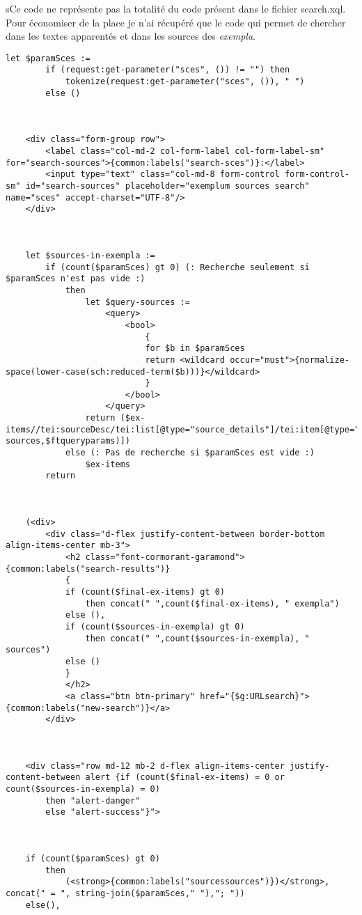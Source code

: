 sCe code ne représente pas la totalité du code présent dans le fichier search.xql. Pour économiser de la place je n'ai récupéré que le code qui permet de chercher dans les textes apparentés et dans les sources des \textit{exempla}. \\


\begin{lstlisting}[breaklines=true]
	let $paramSces := 
		if (request:get-parameter("sces", ()) != "") then 
			tokenize(request:get-parameter("sces", ()), " ") 
		else ()
	


	<div class="form-group row">
		<label class="col-md-2 col-form-label col-form-label-sm" for="search-sources">{common:labels("search-sces")}:</label>
		<input type="text" class="col-md-8 form-control form-control-sm" id="search-sources" placeholder="exemplum sources search" name="sces" accept-charset="UTF-8"/>
	</div>
	
	
	
	let $sources-in-exempla := 
		if (count($paramSces) gt 0) (: Recherche seulement si $paramSces n'est pas vide :)
			then
				let $query-sources := 
					<query>
						<bool>
							{
							for $b in $paramSces 
							return <wildcard occur="must">{normalize-space(lower-case(sch:reduced-term($b)))}</wildcard>
							}
						</bool>
					</query>
				return ($ex-items//tei:sourceDesc/tei:list[@type="source_details"]/tei:item[@type="sources"]/tei:p[ft:query(.,$query-sources,$ftqueryparams)])
			else (: Pas de recherche si $paramSces est vide :)
				$ex-items	
		return 
		

		
	(<div>
		<div class="d-flex justify-content-between border-bottom align-items-center mb-3">
			<h2 class="font-cormorant-garamond">{common:labels("search-results")}
			{
			if (count($final-ex-items) gt 0)
				then concat(" ",count($final-ex-items), " exempla")
			else (),
			if (count($sources-in-exempla) gt 0)
				then concat(" ",count($sources-in-exempla), " sources")
			else ()
			}
			</h2>
			<a class="btn btn-primary" href="{$g:URLsearch}">{common:labels("new-search")}</a>
		</div>
	
	
	
	<div class="row md-12 mb-2 d-flex align-items-center justify-content-between alert {if (count($final-ex-items) = 0 or count($sources-in-exempla) = 0)
		then "alert-danger"
		else "alert-success"}">
	
	
	
	if (count($paramSces) gt 0)
		then 
			(<strong>{common:labels("sourcessources")})</strong>, concat(" = ", string-join($paramSces," "),"; "))
	else(),
	

\end{lstlisting}
